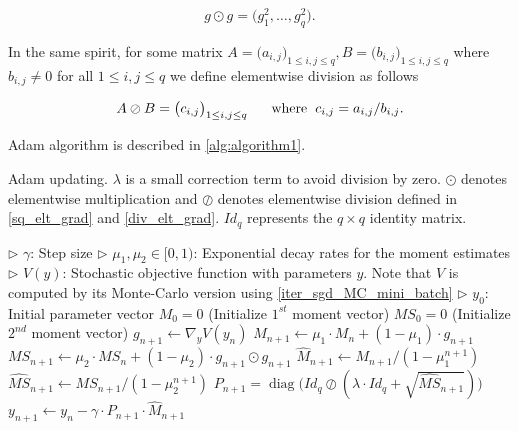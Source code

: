 \documentclass{article}
\DeclareMathOperator{\diag}{diag}
\numberwithin{equation}{section}
\begin{document}
\begin{equation}
\label{sq_elt_grad}
g \odot g = \big(g_1^2, \ldots, g_q^2\big).
\end{equation}

\noindent
In the same spirit, for some matrix $A = \big(a_{i, j} \big)_{1 \le i, j \le q}, B = \big(b_{i, j} \big)_{1 \le i, j \le q}$ where $b_{i, j} \neq 0$ for all $1 \le i, j \le q$ we define elementwise division as follows

\begin{equation}
\label{div_elt_grad}
A \oslash B = \big( c_{i, j} \big)_{1 \le i, j \le q} \hspace{0.6cm} \text{where} \hspace{0.2cm} c_{i, j} = a_{i, j} / b_{i, j}.
\end{equation}


Adam algorithm is described in \ref{alg:algorithm1}.

\newpage


\begin{algorithm}[ht]
  \caption{Adam updating. $\lambda$ is a small correction term to avoid division by zero. $\odot$ denotes elementwise multiplication and $\oslash$ denotes elementwise division defined in \eqref{sq_elt_grad} and \eqref{div_elt_grad}. $Id_q$ represents the $q \times q$ identity matrix.}\label{alg:algorithm1}
  \begin{algorithmic}[1]
    \Require
      \Statex $\rhd$ $\gamma$: Step size
      \Statex $\rhd$ $\mu_1, \mu_2 \in [0, 1)$: Exponential decay rates for the moment estimates
      \Statex $\rhd$ $V(y)$: Stochastic objective function with parameters $y$. Note that $V$ is computed by its Monte-Carlo version using \eqref{iter_sgd_MC_mini_batch}
      \Statex $\rhd$ $y_0$: Initial parameter vector
	\Statex
      \hspace{0.4cm} \Statex $M_0 = 0$ (Initialize $1^{st}$ moment vector)
      \hspace{0.4cm} \Statex $MS_0 = 0$ (Initialize $2^{nd}$ moment vector)
    \Statex
      \State $g_{n+1} \gets \nabla_y V(y_n)$ 
      \State $M_{n+1} \gets \mu_1 \cdot M_n + (1- \mu_1) \cdot g_{n+1}$ 
      \State $MS_{n+1} \gets \mu_2 \cdot MS_n + (1- \mu_2) \cdot g_{n+1} \odot g_{n+1}$ 
      \State $\widehat{M}_{n+1} \gets M_{n+1} / (1 - \mu_1^{n+1})$ 
      \State $\widehat{MS}_{n+1} \gets MS_{n+1} / (1 - \mu_2^{n+1})$ 
      \State $P_{n+1} = \diag\Big(Id_q \oslash (\lambda \cdot Id_q + \sqrt{\widehat{MS}_{n+1}}) \Big)$ 
      \State $y_{n+1} \gets y_n - \gamma \cdot P_{n+1} \cdot \widehat{M}_{n+1}$ 
    \EndWhile
    
  \end{algorithmic}
\end{algorithm}
\end{document}
